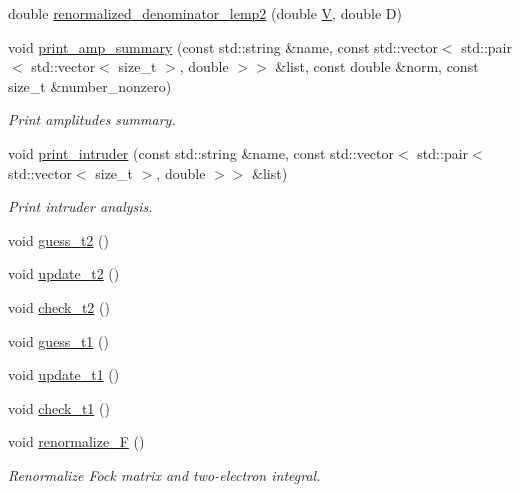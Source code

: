 \begin{DoxyCompactItemize}
\item 
double \mbox{\hyperlink{classforte_1_1_m_r_d_s_r_g___s_o_a80f99c1dba22cf0848bb92148345d35a}{renormalized\+\_\+denominator\+\_\+lemp2}} (double \mbox{\hyperlink{classforte_1_1_m_r_d_s_r_g___s_o_a5282fcd5394254c50c626ad36dd6c0cd}{V}}, double D)
\item 
void \mbox{\hyperlink{classforte_1_1_m_r_d_s_r_g___s_o_ae719a24ec579afda8e45421bbb6b8f3b}{print\+\_\+amp\+\_\+summary}} (const std\+::string \&name, const std\+::vector$<$ std\+::pair$<$ std\+::vector$<$ size\+\_\+t $>$, double $>$$>$ \&list, const double \&norm, const size\+\_\+t \&number\+\_\+nonzero)
\begin{DoxyCompactList}\small\item\em Print amplitudes summary. \end{DoxyCompactList}\item 
void \mbox{\hyperlink{classforte_1_1_m_r_d_s_r_g___s_o_ac0ea4683c8537b2e1cad1bec86095f0c}{print\+\_\+intruder}} (const std\+::string \&name, const std\+::vector$<$ std\+::pair$<$ std\+::vector$<$ size\+\_\+t $>$, double $>$$>$ \&list)
\begin{DoxyCompactList}\small\item\em Print intruder analysis. \end{DoxyCompactList}\item 
void \mbox{\hyperlink{classforte_1_1_m_r_d_s_r_g___s_o_a286ef4b2c338e0039a396c3076dde815}{guess\+\_\+t2}} ()
\item 
void \mbox{\hyperlink{classforte_1_1_m_r_d_s_r_g___s_o_a807fa60fab1c988f8b842e6586dd42e2}{update\+\_\+t2}} ()
\item 
void \mbox{\hyperlink{classforte_1_1_m_r_d_s_r_g___s_o_aa780e9c0f0b9d77b79e94330b9f171e8}{check\+\_\+t2}} ()
\item 
void \mbox{\hyperlink{classforte_1_1_m_r_d_s_r_g___s_o_af1f429bc39c4c44a6d02841c20aeb017}{guess\+\_\+t1}} ()
\item 
void \mbox{\hyperlink{classforte_1_1_m_r_d_s_r_g___s_o_aecb5b35e73efc43a39eb4b5c3c587b87}{update\+\_\+t1}} ()
\item 
void \mbox{\hyperlink{classforte_1_1_m_r_d_s_r_g___s_o_a63219770ebebd21647950812bf20b88e}{check\+\_\+t1}} ()
\item 
void \mbox{\hyperlink{classforte_1_1_m_r_d_s_r_g___s_o_a274e6924bfb1e52378688a628ea11896}{renormalize\+\_\+F}} ()
\begin{DoxyCompactList}\small\item\em Renormalize Fock matrix and two-\/electron integral. \end{DoxyCompactList}\item 

\end{DoxyCompactItemize}
